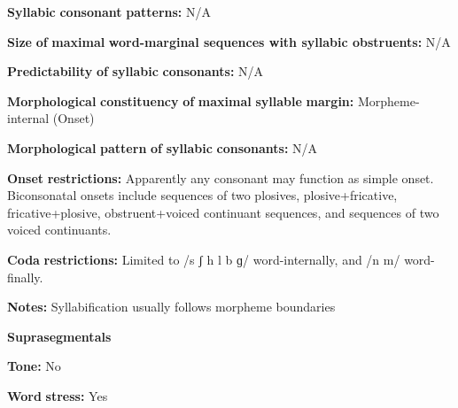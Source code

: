 \begin{styleBody}
\textbf{Syllabic} \textbf{consonant} \textbf{patterns:} N/A
\end{styleBody}

\begin{styleBody}
\textbf{Size} \textbf{of} \textbf{maximal} \textbf{word{}-marginal sequences with syllabic obstruents:} N/A
\end{styleBody}

\begin{styleBody}
\textbf{Predictability} \textbf{of} \textbf{syllabic} \textbf{consonants:} N/A
\end{styleBody}

\begin{styleBody}
\textbf{Morphological} \textbf{constituency} \textbf{of} \textbf{maximal} \textbf{syllable} \textbf{margin:} Morpheme-internal (Onset)
\end{styleBody}

\begin{styleBody}
\textbf{Morphological} \textbf{pattern} \textbf{of} \textbf{syllabic} \textbf{consonants:} N/A
\end{styleBody}

\begin{styleBody}
\textbf{Onset} \textbf{restrictions:} Apparently any consonant may function as simple onset. Biconsonatal onsets include sequences of two plosives, plosive+fricative, fricative+plosive, obstruent+voiced continuant sequences, and sequences of two voiced continuants.
\end{styleBody}

\begin{styleBody}
\textbf{Coda} \textbf{restrictions:} Limited to /s ʃ h l b ɡ/ word-internally, and /n m/ word-finally.
\end{styleBody}

\begin{styleBody}
\textbf{Notes:} Syllabification usually follows morpheme boundaries
\end{styleBody}

\begin{styleBody}
\textbf{Suprasegmentals}
\end{styleBody}

\begin{styleBody}
\textbf{Tone:} No
\end{styleBody}

\begin{styleBody}
\textbf{Word} \textbf{stress:} Yes
\end{styleBody}


